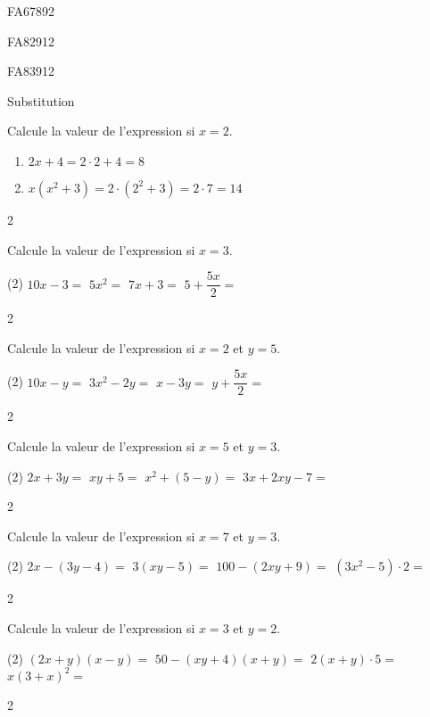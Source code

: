 \documentclass[a4paper,11pt]{report}
\begin{document}
\begin{exol}{FA67}{89}{2}
\end{exol}

\begin{exol}{FA82}{91}{2}
\end{exol}

\begin{exol}{FA83}{91}{2}
\end{exol}

\begin{resolu}{Substitution}
{Calcule la valeur de l'expression si $x=2$.
\begin{enumerate}
    \item $2x+4 = 2\cdot 2 + 4= 8$
    \item $x(x^2 + 3)= 2\cdot (2^2 + 3)=2 \cdot 7 =14$
\end{enumerate}
}
{2}
\end{resolu}

\begin{exo}
{Calcule la valeur de l'expression si $x=3$.
\begin{tasks}(2)
    \task $10x-3=$
     \task $5x^2=$
     \task $7x+3=$
     \task $5+\dfrac{5x}{2}=$
\end{tasks}
}
{2}
\end{exo}

\begin{exo}
{Calcule la valeur de l'expression si $x=2$ et $y=5$.
\begin{tasks}(2)
    \task $10x-y=$
     \task $3x^2-2y=$
     \task $x-3y=$
     \task $y+\dfrac{5x}{2}=$
\end{tasks}
}
{2}
\end{exo}


\begin{exo}
{Calcule la valeur de l'expression si $x=5$ et $y=3$.
\begin{tasks}(2)
    \task $2x+3y=$
     \task $xy+5=$
     \task $x^2+(5-y)=$
     \task $3x+2xy-7=$
\end{tasks}
}
{2}
\end{exo}

\begin{exo}
{Calcule la valeur de l'expression si $x=7$ et $y=3$.
\begin{tasks}(2)
    \task $2x-(3y-4)=$
     \task $3(xy-5)=$
     \task $100-(2xy+9)=$
     \task $(3x^2-5)\cdot2=$
\end{tasks}
}
{2}
\end{exo}

\begin{exo}
{Calcule la valeur de l'expression si $x=3$ et $y=2$.
\begin{tasks}(2)
    \task $(2x+y)(x-y)=$
     \task $50-(xy+4)(x+y)=$
     \task $2(x+y)\cdot5=$
     \task $x(3+x)^2=$
\end{tasks}
}
{2}
\end{exo}
\end{document}
